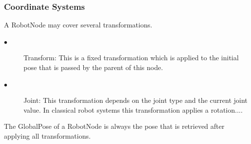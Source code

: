 \subsubsection{Coordinate Systems}
\par
A RobotNode may cover several transformations.
\par
\begin{description}
  \item[$\bullet$]Transform: This is a fixed transformation which is applied to the initial pose that is passed by the parent of this node.
    \item[$\bullet$] Joint: This transformation depends on the joint type and the current joint value. In classical robot systems this transformation applies a rotation....
\end{description}
   \par
   The GlobalPose of a RobotNode is always the pose that is retrieved after applying all transformations. 
   \par
